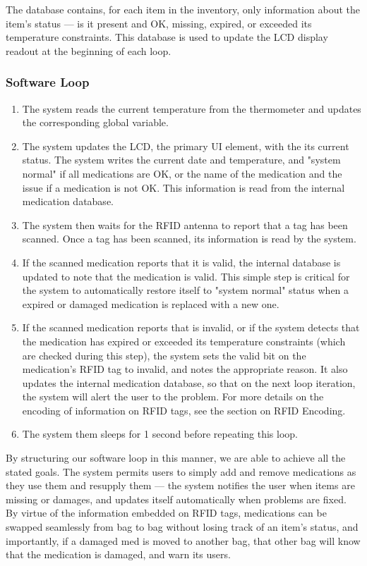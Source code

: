 \documentclass{sigchi}
\begin{document}
The database contains, for each item in the inventory, only information about
the item's status --- is it present and OK, missing, expired, or exceeded
its temperature constraints. This database is used to update the LCD display
readout at the beginning of each loop.


\subsubsection{Software Loop}
\begin{enumerate}
\item The system reads the current temperature from the thermometer and updates
	the corresponding global variable.
\item The system updates the LCD, the primary UI element, with the its current
	status. The system writes the current date and temperature, and "system
    normal" if all medications are OK, or the name of the medication and the
    issue if a medication is not OK. This information is read from the
    internal medication database.
\item The system then waits for the RFID antenna to report that a tag has been
	scanned. Once a tag has been scanned, its information is read by the system.
\item If the scanned medication reports that it is valid, the internal database
	is updated to note that the medication is valid. This simple step is critical
    for the system to automatically restore itself to "system normal" status
    when a expired or damaged medication is replaced with a new one.
\item If the scanned medication reports that is invalid, or if the system detects
	that the medication has expired or exceeded its temperature constraints (which
    are checked during this step), the system sets the valid bit on the medication's
    RFID tag to invalid, and notes the appropriate reason. It also updates the
    internal medication database, so that on the next loop iteration, the system
    will alert the user to the problem. For more details on the encoding of
    information on RFID tags, see the section on RFID Encoding.
\item The system them sleeps for 1 second before repeating this loop.
\end{enumerate}

By structuring our software loop in this manner, we are able to achieve all the
stated goals. The system permits users to simply add and remove medications as they
use them and resupply them --- the system notifies the user when items are missing
or damages, and updates itself automatically when problems are fixed. By virtue of
the information embedded on RFID tags, medications can be swapped seamlessly from
bag to bag without losing track of an item's status, and importantly, if a damaged
med is moved to another bag, that other bag will know that the medication is damaged,
and warn its users.
\end{document}
